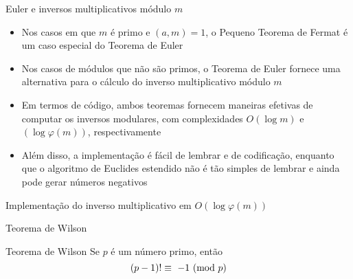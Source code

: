 \begin{frame}[fragile]{Euler e inversos multiplicativos módulo $m$}

    \begin{itemize}
        \item Nos casos em que $m$ é primo e $(a, m) = 1$, o Pequeno Teorema de Fermat é um caso 
            especial do Teorema de Euler

        \item Nos casos de módulos que não são primos, o Teorema de Euler fornece uma alternativa
            para o cálculo do inverso multiplicativo módulo $m$

        \item Em termos de código, ambos teoremas fornecem maneiras efetivas de computar os 
            inversos modulares, com complexidades $O(\log m)$ e $(\log \varphi(m))$, respectivamente

        \item Além disso, a implementação é fácil de lembrar e de codificação, enquanto que 
            o algoritmo de Euclides estendido não é tão simples de lembrar e ainda pode gerar
            números negativos
    \end{itemize}

\end{frame}

\begin{frame}[fragile]{Implementação do inverso multiplicativo em $O(\log \varphi(m))$}
\end{frame}

\begin{frame}[fragile]{Teorema de Wilson}

    \begin{block}{Teorema de Wilson}
        Se $p$ é um número primo, então
        $$
            (p - 1)!\equiv\ \Mod{-1}{p}
        $$
    \end{block}

\end{frame}

